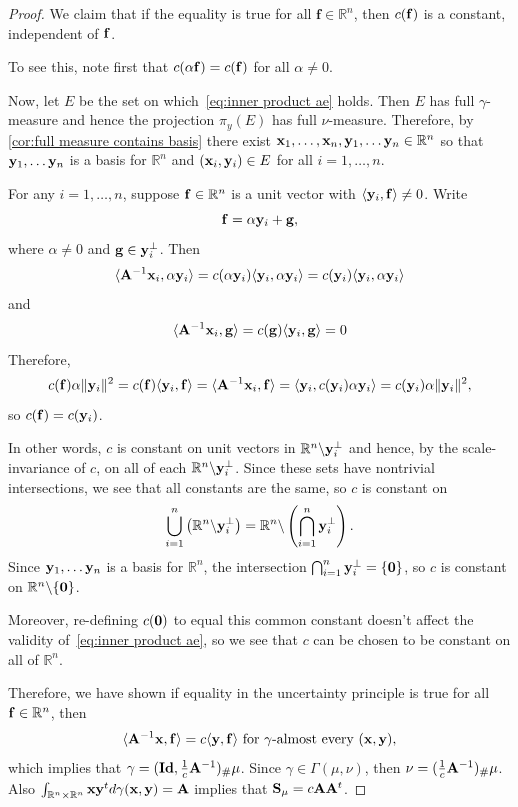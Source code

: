 \documentclass{amsart}
\numberwithin{equation}{section}
\newcommand\R{{\mathbb R}}
\theoremstyle{plain}
\theoremstyle{remark}
\theoremstyle{definition}
\begin{document}
\begin{proof}
We claim that if the equality is true for all $\mathbf{f} \in \mathbb{R}^n$, then $c({\bf f})$ is a constant, independent of ${\bf f}$. 

To see this, note first that $c(\alpha {\bf f}) = c({\bf f})$ for all $\alpha \neq 0$. 

Now, let $E$ be the set on which~\eqref{eq:inner product ae} holds. Then $E$ has full $\gamma$-measure and hence the projection $\pi_y(E)$ has full $\nu$-measure. Therefore, by \cref{cor:full measure contains basis} there exist ${\bf x}_1, \dots , {\bf x}_n, {\bf y}_1, \dots {\bf y}_n \in \R^n$ so that ${\bf y}_1, \dots {\bf y}_n$ is a basis for $\R^n$ and $({\bf x}_i, {\bf y}_i) \in E$ for all $i=1, \dots , n$.

For any $i=1, \dots , n$, suppose ${\bf f} \in \R^n$ is a unit vector with $\langle {\bf y}_i, {\bf f} \rangle \neq 0$. Write 
\[
    {\bf f} = \alpha {\bf y}_i + {\bf g},
\]
where $\alpha \neq 0$ and ${\bf g} \in {\bf y}_i^\perp$. Then
\[
\langle {\bf A}^{-1}{\bf x}_i,\alpha {\bf y}_i\rangle
= c(\alpha {\bf y}_i) \langle {\bf y}_i,\alpha {\bf y}_i\rangle = c({\bf y}_i) \langle {\bf y}_i,\alpha {\bf y}_i\rangle
\]
and
\[
    \langle {\bf A}^{-1}{\bf x}_i,{\bf g}\rangle = c({\bf g}) \langle {\bf y}_i,{\bf g}\rangle = 0
\]
Therefore,
\[
    c({\bf f}) \alpha \|{\bf y}_i\|^2 = c({\bf f})\langle {\bf y}_i, {\bf f}\rangle = \langle {\bf A}^{-1} {\bf x}_i , {\bf f} \rangle = \langle {\bf y}_i , c({\bf y}_i) \alpha {\bf y}_i\rangle = c({\bf y}_i) \alpha \|{\bf y}_i\|^2,
\]
so $c({\bf f}) = c({\bf y}_i)$. 

In other words, $c$ is constant on unit vectors in $\R^n \backslash{\bf y}_i^\perp$ and hence, by the scale-invariance of $c$, on all of each $\R^n \backslash{\bf y}_i^\perp$. Since these sets have nontrivial intersections, we see that all constants are the same, so $c$ is constant on 
$$\bigcup_{i=1}^n \left(\R^n \backslash {\bf y}_i^\perp\right) = \R^n \backslash \left(\bigcap_{i=1}^n {\bf y}_i^\perp\right).
$$
Since ${\bf y}_1, \dots {\bf y}_n$ is a basis for $\R^n$, the intersection $\bigcap_{i=1}^n {\bf y}_i^\perp = \{{\bf 0}\}$, so $c$ is constant on $\R^n \backslash \{{\bf 0}\}$.

Moreover, re-defining $c({\bf 0})$ to equal this common constant doesn't affect the validity of~\eqref{eq:inner product ae}, so we see that $c$ can be chosen to be constant on all of $\R^n$.

Therefore, we have shown if equality in the uncertainty principle is true for all ${\bf f} \in \mathbb{R}^n$,  then
$$\langle {\bf A}^{-1}{\bf x},{\bf f}\rangle
= c \langle {\bf y},{\bf f}\rangle
\ \text{for $\gamma$-almost every }({\bf x},{\bf y}),$$ which implies that $\gamma = (\mathbf{Id}, \frac{1}{c}{\bf A}^{-1})_\#\mu$. Since $\gamma \in \Gamma(\mu, \nu)$, then $\nu = (\frac{1}{c}{\bf A}^{-1})_\#\mu$. Also $\int_{\mathbb{R}^n \times \mathbb{R}^n} {\bf x} {\bf y}^t d\gamma({\bf x, y}) = {\bf A}$ implies that ${\bf S}_{\mu}=c{\bf A}{\bf A}^{t}$.


\end{proof}
\end{document}
